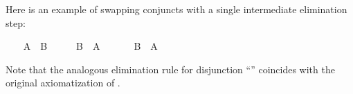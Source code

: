 \begin{isabellebody}
\isadelimproof
%
\endisadelimproof
%
\begin{isamarkuptext}%
\noindent Here is an example of swapping conjuncts with a single
  intermediate elimination step:%
\end{isamarkuptext}%
\isamarkuptrue%
%
\isadelimproof
%
\endisadelimproof
%
\isatagproof
\ \ \isamarkupfalse%
\ {\isachardoublequoteopen}A\ {\isasymand}\ B{\isachardoublequoteclose}\isanewline
\ \ \isamarkupfalse%
\ \isamarkupfalse%
\ B\ \ A\ \isacommand{{\isachardot}{\isachardot}}\isamarkupfalse%
\isanewline
\ \ \isamarkupfalse%
\ \isamarkupfalse%
\ {\isachardoublequoteopen}B\ {\isasymand}\ A{\isachardoublequoteclose}\ \isacommand{{\isachardot}{\isachardot}}\isamarkupfalse%
%
\endisatagproof
{\isafoldproof}%
%
\isadelimproof
%
\endisadelimproof
%
\begin{isamarkuptext}%
\noindent Note that the analogous elimination rule for disjunction
  ``'' coincides with
  the original axiomatization of .


\end{isamarkuptext}
\end{isabellebody}
